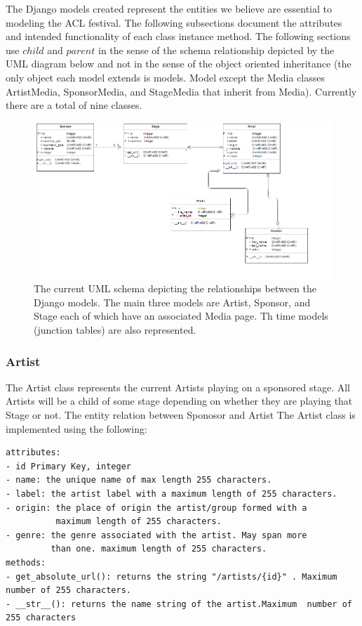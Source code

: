 \documentclass[12pt,english]{scrartcl}
\begin{document}
The Django models created represent the entities we believe are essential to modeling the ACL festival.
The following subsections document the attributes and intended functionality of each class instance method. The following sections use
$child$ and $parent$ in the sense of the schema relationship depicted by the UML diagram below and not in the sense of the object oriented inheritance 
(the only object each model extends is models. Model except the Media classes ArtistMedia, SponsorMedia, and StageMedia that inherit from Media). Currently there are a total of nine classes.



\begin{figure}[h!]
\includegraphics[width=\textwidth]{UML.png}
 \caption{The current UML schema depicting the relationships between the Django models. The main three models are Artist, Sponsor, and Stage each of which have an associated Media page. Th time models (junction tables) 
 are also represented.}
\end{figure}

\subsubsection{Artist}

The Artist class represents the current Artists playing on a sponsored stage. All Artists will be a child of some
stage depending on whether they are playing that Stage or not. The entity relation between Sponosor and Artist  The Artist class is implemented using the following:
\begin{verbatim}
attributes:
- id Primary Key, integer
- name: the unique name of max length 255 characters.
- label: the artist label with a maximum length of 255 characters.
- origin: the place of origin the artist/group formed with a 
          maximum length of 255 characters.
- genre: the genre associated with the artist. May span more 
         than one. maximum length of 255 characters.
methods:
- get_absolute_url(): returns the string "/artists/{id}" . Maximum number of 255 characters.
- __str__(): returns the name string of the artist.Maximum  number of 255 characters
\end{verbatim}
\end{document}
